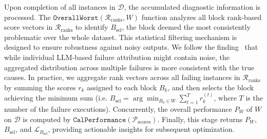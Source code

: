 \documentclass{article}
\theoremstyle{plain}
\theoremstyle{definition}
\theoremstyle{remark}
\begin{document}
Upon completion of all instances in $\mathcal{D}$, the accumulated diagnostic information is processed. The $\texttt{OverallWorst}(\mathcal{R}_{\text{ranks}}, W)$ function analyzes all block rank-based score vectors in $\mathcal{R}_{\text{ranks}}$ to identify $B_{\text{sel}}$, the block deemed the most consistently problematic over the whole dataset. This statistical filtering mechanism is designed to ensure robustness against noisy outputs. We follow the finding~\citep{zhang_which_2025} that while individual LLM-based failure attribution might contain noise, the aggregated distribution across multiple failures is more consistent with the true causes. In practice, we aggregate rank vectors across all failing instances in $\mathcal{R}_{\text{ranks}}$ by summing the scores $r_k$ assigned to each block $B_k$, and then selects the block achieving the minimum sum (i.e. $B_{\text{sel}} = \arg\min_{B_k \in W} \sum_{t=1}^T r_{k}^{(t)}$, where $T$ is the number of the failure executions). Concurrently, the overall performance $P_W$ of $W$ on $\mathcal{D}$ is computed by $\texttt{CalPerformance}(\mathcal{P}_{\text{scores}})$. Finally, this stage returns $P_W$, $B_{\text{sel}}$, and $\mathcal{L}_{B_{\text{sel}}}$, providing actionable insights for subsequent optimization.
\end{document}
